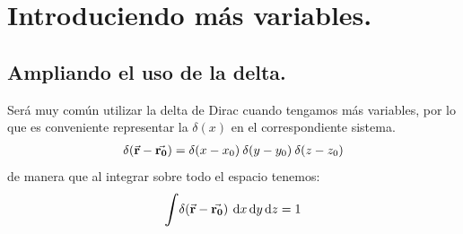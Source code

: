 \documentclass[12pt]{article}
\def\scaleint#1{\vcenter{\hbox{\scaleto[3ex]{\displaystyle\int}{#1}}}}
\numberwithin{equation}{section}
\begin{document}

\section{Introduciendo más variables.}
\subsection{Ampliando el uso de la delta.}

Será muy común utilizar la delta de Dirac cuando tengamos más variables,  por lo que es conveniente representar la $\delta (x)$ en el correspondiente sistema.
\begin{align}
\delta (\va{\bm{r}} - \va{\bm{r_{0}}}) = \delta (x - x_{0}) \: \delta (y - y_{0}) \: \delta (z - z_{0})
\label{eq:ecuacion_A_03}
\end{align}
de manera que al integrar sobre todo el espacio tenemos:
\begin{align*}
\scaleint{6ex} \delta (\va{\bm{r}} - \va{\bm{r_{0}}}) \: \dd{x} \dd{y}  \dd{z} = 1
\end{align*}
\end{document}
